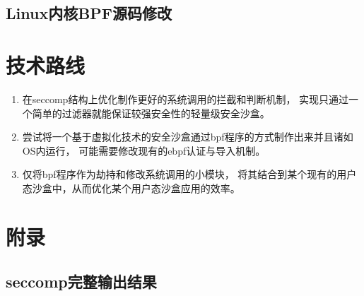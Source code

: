 \documentclass[AutoFakeBold,a4paper]{ctexart}
\begin{document}
\subsection{Linux内核BPF源码修改}

\section{技术路线}

\begin{enumerate}
    \item 在seccomp结构上优化制作更好的系统调用的拦截和判断机制，
    实现只通过一个简单的过滤器就能保证较强安全性的轻量级安全沙盒。\label{路线1}
    \item 尝试将一个基于虚拟化技术的安全沙盒通过bpf程序的方式制作出来并且诸如OS内运行，
    可能需要修改现有的ebpf认证与导入机制。\label{路线2}
    \item 仅将bpf程序作为劫持和修改系统调用的小模块，
    将其结合到某个现有的用户态沙盒中，从而优化某个用户态沙盒应用的效率。\label{路线3}
\end{enumerate}




\section{附录}

\subsection{seccomp完整输出结果}


\end{document}

